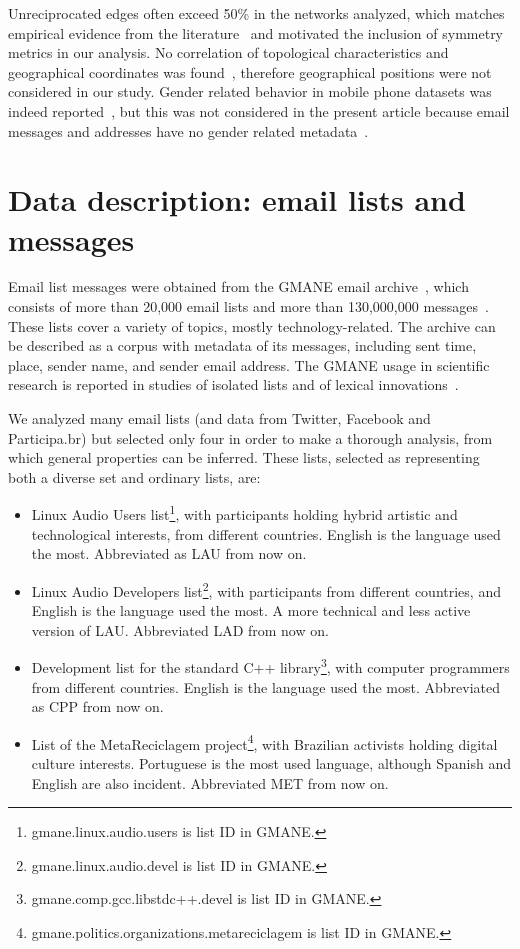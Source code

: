 \documentclass[%
	aip,
	jmp,%
	amsmath,amssymb,
	reprint,%
]{revtex4-1}
\begin{document}
Unreciprocated edges often exceed 50\% in the networks analyzed, which matches empirical evidence from the literature~\cite{newmanEvolving} and motivated the inclusion of symmetry metrics in our analysis. No correlation of topological characteristics and geographical coordinates was found~\cite{barabasiGeo}, therefore geographical positions were not considered in our study. Gender related behavior in mobile phone datasets was indeed reported~\cite{barabasiSex}, but this was not considered in the present article because email messages and addresses have no gender related metadata~\cite{gmanePack}.


\section{Data description: email lists and messages}\label{sec:data}

Email list messages were obtained from
the GMANE email archive~\cite{gmanePack}, which consists of more than 20,000 email lists and more than 130,000,000 messages~\cite{GMANEwikipedia}. These lists cover a variety of topics, mostly technology-related. The archive can be described as a corpus with metadata of its messages, including sent time, place, sender name, and sender email address.
The GMANE usage in scientific research is reported in studies of isolated lists and of lexical innovations~\cite{GMANE2,bird}. 

We analyzed many email lists (and data from Twitter, Facebook and Participa.br) but selected only four in order to make a thorough analysis, from which general properties can be inferred. These lists, selected as representing both a diverse set and ordinary lists, are:
\begin{itemize}
	\item Linux Audio Users list\footnote{gmane.linux.audio.users is list ID in GMANE.}, with participants holding hybrid artistic and technological interests, from different countries. English is the language used the most. Abbreviated as LAU from now on.
	\item Linux Audio Developers list\footnote{gmane.linux.audio.devel is list ID in GMANE.}, with participants from different countries, and English is the language used the most. A more technical and less active version of LAU. Abbreviated LAD from now on.
	\item Development list for the standard C++ library\footnote{gmane.comp.gcc.libstdc++.devel is list ID in GMANE.}, with computer programmers from different countries. English is the language used the most. Abbreviated as CPP from now on.
	\item List of the MetaReciclagem project\footnote{gmane.politics.organizations.metareciclagem is list ID in GMANE.}, with Brazilian activists holding digital culture interests. Portuguese is the most used language, although Spanish and English are also incident. Abbreviated MET from now on.
\end{itemize} 
\end{document}
